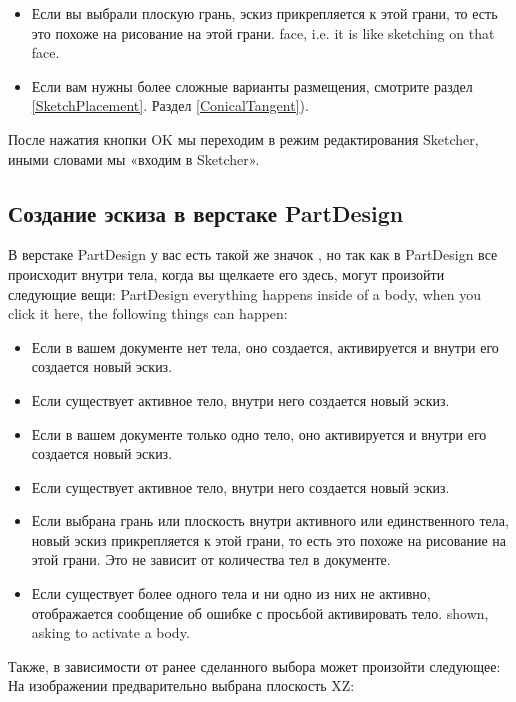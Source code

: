 \documentclass[12pt,titlepage]{article}
\newcommand{\icon}[1]{\raisebox{-1em}{\rule{0pt}{27pt}\texttt{[image: images/\#1]}}}
\newcommand{\img}[2]{\vspace{2ex}\noindent\texttt{[image: images/\#2]}}
\begin{document}
\begin{itemize}
 ничего не было выбрано, вас спросят об ориентации эскиза:
Для создания эскиза:

\img{scale=0.8}{Orientation}

С помощью радиокнопки вы можете управлять плоскостью, в которой вы хотите создать эскиз.
sketch. Отметка «Развернуть направление» прикрепит эскиз к обратной стороне выбранной плоскости, по аналогии с  рисунком на обратной стороне листа бумаги.
of the selected plane like drawing on the backside of a sheet of paper. «Смещение» перемещает эскиз в направлении, перпендикулярном выбранной плоскости.
the selected plane.

\item Если вы выбрали плоскую грань, эскиз прикрепляется к этой грани, то есть это похоже на рисование на этой грани.
      face, i.e. it is like sketching on that face.

\item Если вам нужны более сложные варианты размещения, смотрите раздел       \ref{SketchPlacement}.
      Раздел \vref {ConicalTangent}).
\end{itemize}
После нажатия кнопки OK мы переходим в режим редактирования Sketcher, иными словами мы «входим в Sketcher».


\subsection{Создание эскиза в верстаке PartDesign}
В верстаке PartDesign у вас есть такой же значок \icon{Sketcher_NewSketch}, но так как в PartDesign все происходит внутри тела, когда вы щелкаете его здесь, могут произойти следующие вещи:
PartDesign everything happens inside of a body, when you click it here, the
following things can happen:

\begin{itemize}
\item Если в вашем документе нет тела, оно создается, активируется и внутри его создается новый эскиз.
      \item Если существует активное тело, внутри него  создается новый эскиз.
\item Если в вашем документе только одно тело, оно активируется и внутри его создается новый эскиз.
      \item Если существует активное тело, внутри него  создается новый эскиз.
\item Если выбрана грань или плоскость внутри активного или единственного тела, новый эскиз прикрепляется к этой грани, то есть это похоже на рисование на этой грани.
      Это не зависит от количества тел в документе.
\item Если существует более одного тела и ни одно из них не активно, отображается сообщение об ошибке с просьбой активировать тело.
      shown, asking to activate a body.
\end{itemize}
Также, в зависимости от ранее сделанного выбора может произойти следующее:
На изображении предварительно выбрана плоскость XZ:
\end{document}
